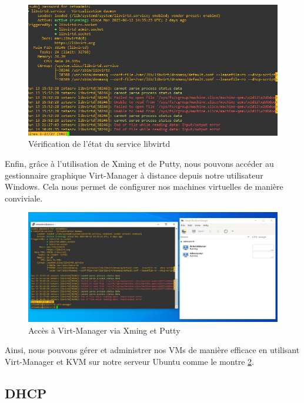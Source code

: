\begin{figure}[H]
 \centering
    \includegraphics[width=15cm]{Images/installkvm2.png}
    \caption{Vérification de l'état du service libvirtd}
    \label{fig:libvirtd-status}
\end{figure}

Enfin, grâce à l'utilisation de Xming et de Putty, nous pouvons accéder au gestionnaire graphique Virt-Manager à distance depuis notre utilisateur Windows. Cela nous permet de configurer nos machines virtuelles de manière conviviale. \\

\begin{figure}[H]
 \centering
    \includegraphics[width=15cm]{Images/resultvirtmanager.png}
    \caption{Accès à Virt-Manager via Xming et Putty}
    \label{fig:virt-manager-access}
\end{figure}

Ainsi, nous pouvons gérer et administrer nos VMs de manière efficace en utilisant Virt-Manager et KVM sur notre serveur Ubuntu comme le montre \ref{fig:virt-manager-access}. \\


\subsection{DHCP}

